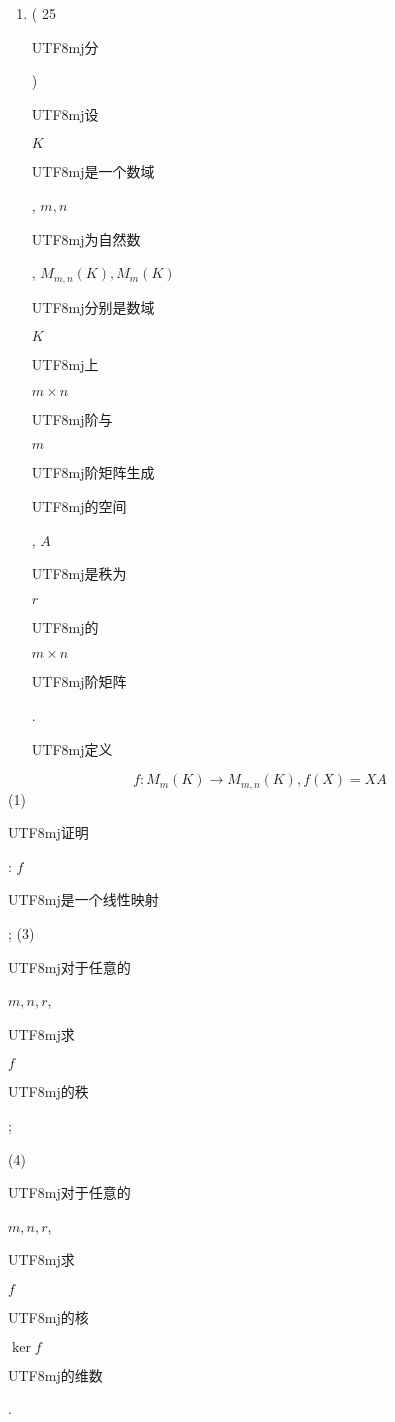 \documentclass[10pt]{article}
\begin{document}
\begin{enumerate}
  \item ( 25 \begin{CJK}{UTF8}{mj}分\end{CJK}) \begin{CJK}{UTF8}{mj}设\end{CJK} $K$ \begin{CJK}{UTF8}{mj}是一个数域\end{CJK}, $m, n$ \begin{CJK}{UTF8}{mj}为自然数\end{CJK}, $M_{m, n}(K), M_{m}(K)$ \begin{CJK}{UTF8}{mj}分别是数域\end{CJK} $K$ \begin{CJK}{UTF8}{mj}上\end{CJK} $m \times n$ \begin{CJK}{UTF8}{mj}阶与\end{CJK} $m$ \begin{CJK}{UTF8}{mj}阶矩阵生成\end{CJK} \begin{CJK}{UTF8}{mj}的空间\end{CJK}, $A$ \begin{CJK}{UTF8}{mj}是秩为\end{CJK} $r$ \begin{CJK}{UTF8}{mj}的\end{CJK} $m \times n$ \begin{CJK}{UTF8}{mj}阶矩阵\end{CJK}. \begin{CJK}{UTF8}{mj}定义\end{CJK}

\end{enumerate}
$$
f: M_{m}(K) \rightarrow M_{m, n}(K), f(X)=X A
$$
(1) \begin{CJK}{UTF8}{mj}证明\end{CJK}: $f$ \begin{CJK}{UTF8}{mj}是一个线性映射\end{CJK}; (3) \begin{CJK}{UTF8}{mj}对于任意的\end{CJK} $m, n, r$, \begin{CJK}{UTF8}{mj}求\end{CJK} $f$ \begin{CJK}{UTF8}{mj}的秩\end{CJK};

(4) \begin{CJK}{UTF8}{mj}对于任意的\end{CJK} $m, n, r$, \begin{CJK}{UTF8}{mj}求\end{CJK} $f$ \begin{CJK}{UTF8}{mj}的核\end{CJK} $\operatorname{ker} f$ \begin{CJK}{UTF8}{mj}的维数\end{CJK}.
\end{document}
